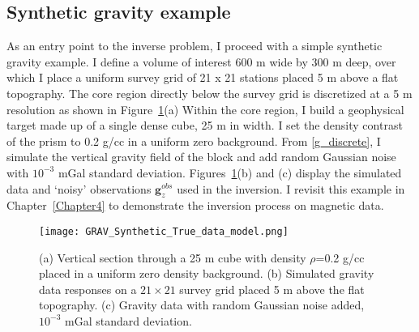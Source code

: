 \subsection{Synthetic gravity example}
As an entry point to the inverse problem, I proceed with a simple synthetic gravity example. I define a volume of interest 600 m wide by 300 m deep, over which I place a uniform survey grid of 21 x 21 stations placed 5 m above a flat topography.
The core region directly below the survey grid is discretized at a 5 m resolution as shown in Figure~\ref{GRAV_model}(a)
Within the core region, I build a geophysical target made up of a single dense cube, 25 m in width. I set the density contrast of the prism to 0.2 g/cc in a uniform zero background. From \eqref{g_discrete}, I simulate the vertical gravity field of the block and add random Gaussian noise with $10^{-3}$ mGal standard deviation. Figures~\ref{GRAV_model}(b) and (c) display the simulated data and `noisy' observations $\mathbf{g}_z^{obs}$ used in the inversion. I revisit this example in Chapter~\ref{Chapter4} to demonstrate the inversion process on magnetic data.
\begin{figure}[h!]
{\centering
\texttt{[image: GRAV\_Synthetic\_True\_data\_model.png]}}
\caption{(a) Vertical section through a 25 m cube with density $\rho$=0.2 g/cc placed in a uniform zero density background. (b) Simulated gravity data responses on a $21 \times 21$ survey grid placed 5 m above the flat topography. (c) Gravity data with random Gaussian noise added, $10^{-3}$ mGal standard deviation.}
\label{GRAV_model}
\end{figure}

